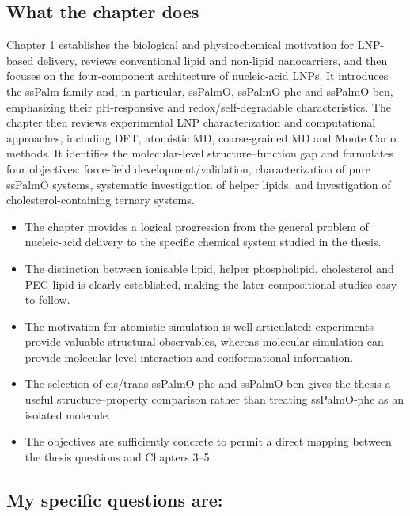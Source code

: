 \documentclass[11pt,a4paper]{article}
\begin{document}
\subsection*{What the chapter does}

Chapter 1 establishes the biological and physicochemical motivation for LNP-based delivery, reviews conventional lipid and non-lipid nanocarriers, and then focuses on the four-component architecture of nucleic-acid LNPs. It introduces the ssPalm family and, in particular, ssPalmO, ssPalmO-phe and ssPalmO-ben, emphasizing their pH-responsive and redox/self-degradable characteristics. The chapter then reviews experimental LNP characterization and computational approaches, including DFT, atomistic MD, coarse-grained MD and Monte Carlo methods. It identifies the molecular-level structure--function gap and formulates four objectives: force-field development/validation, characterization of pure ssPalmO systems, systematic investigation of helper lipids, and investigation of cholesterol-containing ternary systems.
\begin{itemize}[leftmargin=*]
\item The chapter provides a logical progression from the general problem of nucleic-acid delivery to the specific chemical system studied in the thesis.
\item The distinction between ionisable lipid, helper phospholipid, cholesterol and PEG-lipid is clearly established, making the later compositional studies easy to follow.
\item The motivation for atomistic simulation is well articulated: experiments provide valuable structural observables, whereas molecular simulation can provide molecular-level interaction and conformational information.
\item The selection of cis/trans ssPalmO-phe and ssPalmO-ben gives the thesis a useful structure--property comparison rather than treating ssPalmO-phe as an isolated molecule.
\item The objectives are sufficiently concrete to permit a direct mapping between the thesis questions and Chapters 3--5.
\end{itemize}

\subsection*{My specific questions are:}
\end{document}
